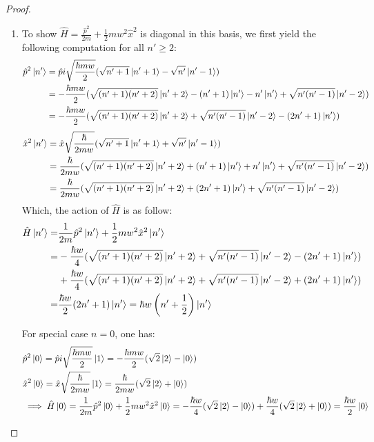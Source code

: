 \documentclass{article}
\begin{document}
\begin{proof}
\begin{enumerate}
        \hfil

        \item To show $\hat{H}=\frac{\hat{p}^2}{2m}+\frac{1}{2}mw^2\hat{x}^2$ is diagonal in this basis, we first yield the following computation for all $n'\geq 2$:
        \begin{align}
            \hat{p}^2\ket{n'} &= \hat{p} i\sqrt{\frac{\hbar mw}{2}}(\sqrt{n'+1}\ket{n'+1} - \sqrt{n'}\ket{n'-1})\\
            &= -\frac{\hbar mw}{2}(\sqrt{(n'+1)(n'+2)}\ket{n'+2} - (n'+1)\ket{n'} - n'\ket{n'}+ \sqrt{n'(n'-1)}\ket{n'-2})\\
            &= -\frac{\hbar mw}{2}(\sqrt{(n'+1)(n'+2)}\ket{n'+2} + \sqrt{n'(n'-1)}\ket{n'-2} - (2n'+1)\ket{n'})
        \end{align}
        \begin{align}
            \hat{x}^2 \ket{n'} &= \hat{x}\sqrt{\frac{\hbar}{2mw}}(\sqrt{n'+1}\ket{n'+1} + \sqrt{n'}\ket{n'-1})\\
            &= \frac{\hbar}{2mw}(\sqrt{(n'+1)(n'+2)}\ket{n'+2} + (n'+1)\ket{n'} + n'\ket{n'} + \sqrt{n'(n'-1)}\ket{n'-2})\\
            &= \frac{\hbar}{2mw}(\sqrt{(n'+1)(n'+2)}\ket{n'+2} + (2n'+1)\ket{n'} + \sqrt{n'(n'-1)}\ket{n'-2})
        \end{align}
        Which, the action of $\hat{H}$ is as follow:
        \begin{align}
            \hat{H}\ket{n'} =& \frac{1}{2m}\hat{p}^2\ket{n'}+\frac{1}{2}mw^2\hat{x}^2\ket{n'}\\
            =& -\frac{\hbar w}{4}(\sqrt{(n'+1)(n'+2)}\ket{n'+2}+\sqrt{n'(n'-1)}\ket{n'-2}-(2n'+1)\ket{n'})\\
            &+ \frac{\hbar w}{4}(\sqrt{(n'+1)(n'+2)}\ket{n'+2}+\sqrt{n'(n'-1)}\ket{n'-2}+(2n'+1)\ket{n'})\\
            =& \frac{\hbar w}{2}(2n'+1)\ket{n'} = \hbar w\left(n'+\frac{1}{2}\right)\ket{n'}
        \end{align}

        \hfil

        For special case $n=0$, one has:
        \begin{align}
            &\hat{p}^2\ket{0} = \hat{p}i\sqrt{\frac{\hbar mw}{2}}\ket{1} = -\frac{\hbar mw}{2}(\sqrt{2}\ket{2}-\ket{0})\\
            &\hat{x}^2\ket{0} = \hat{x}\sqrt{\frac{\hbar}{2mw}}\ket{1} = \frac{\hbar}{2mw}(\sqrt{2}\ket{2}+\ket{0})\\
            &\implies \hat{H}\ket{0} = \frac{1}{2m}\hat{p}^2\ket{0}+\frac{1}{2}mw^2\hat{x}^2\ket{0} = -\frac{\hbar w}{4}(\sqrt{2}\ket{2}-\ket{0}) + \frac{\hbar w}{4}(\sqrt{2}\ket{2}+\ket{0}) = \frac{\hbar w}{2}\ket{0}
        \end{align}


\end{enumerate}
\end{proof}
\end{document}
